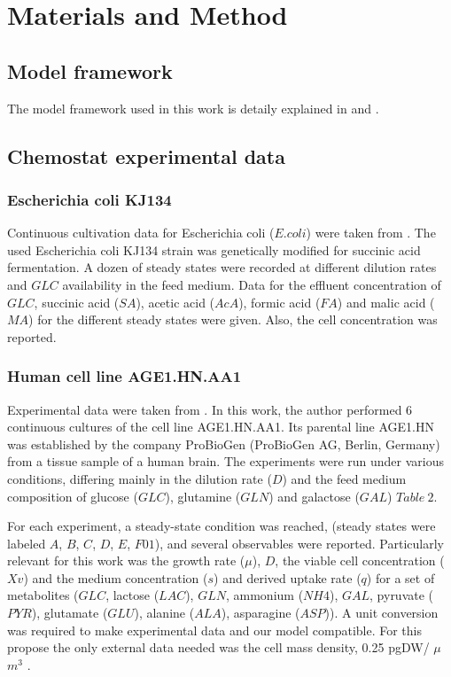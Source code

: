 \documentclass[]{article}
\begin{document}
	
	
	
	
	\section{Materials and Method}
	
	
	\subsection{Model framework }
	The model framework used in this work is detaily explained in  and .
	
	\subsection{Chemostat experimental data} 
	
	\subsubsection{Escherichia coli KJ134} 
	Continuous cultivation data for Escherichia coli ($E. coli$) were taken from . The used Escherichia coli KJ134 strain was genetically modified for succinic acid fermentation. A dozen of steady states were recorded at different dilution rates and $GLC$ availability in the feed medium. Data for the effluent concentration of $GLC$, succinic acid ($SA$), acetic acid ($AcA$), formic acid ($FA$) and malic acid ($MA$) for the different steady states were given. Also, the cell concentration was reported.
	
	
	\subsubsection{Human cell line AGE1.HN.AA1} 
	Experimental data were taken from . In this work, the author performed 6 continuous cultures of the cell line AGE1.HN.AA1. Its parental line AGE1.HN was established by the company ProBioGen (ProBioGen AG, Berlin, Germany) from a tissue sample of a human brain. The experiments were run under various conditions, differing mainly in the dilution rate ($D$) and the feed medium composition of glucose ($GLC$), glutamine ($GLN$) and galactose ($GAL$) $Table\ 2$.
	
	For each experiment, a steady-state condition was reached, (steady states were labeled $A$, $B$, $C$, $D$, $E$, $F01$), and several observables were reported. Particularly relevant for this work was the growth rate ($\mu$), $D$, the viable cell concentration ($Xv$) and the medium concentration ($s$) and derived uptake rate ($q$) for a set of metabolites ($GLC$, lactose ($LAC$), $GLN$, ammonium ($NH4$), $GAL$, pyruvate ($PYR$), glutamate ($GLU$), alanine ($ALA$), asparagine ($ASP$)). A unit conversion was required to make experimental data and our model compatible. For this propose the only external data needed was the cell mass density, 0.25 pgDW/ $\mu$$m^3$ .
	
\end{document}
